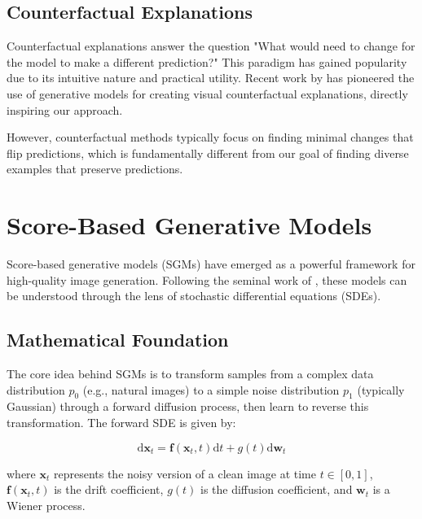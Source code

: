 \documentclass[licencjacka,en]{pracamgr}
\newcommand{\diff}{\mathrm{d}}
\begin{document}
\subsection{Counterfactual Explanations}

Counterfactual explanations answer the question "What would need to change for the model to make a different prediction?" This paradigm has gained popularity due to its intuitive nature and practical utility. Recent work by \cite{sobieski2024rethinkingvisualcounterfactualexplanations} has pioneered the use of generative models for creating visual counterfactual explanations, directly inspiring our approach.

However, counterfactual methods typically focus on finding minimal changes that flip predictions, which is fundamentally different from our goal of finding diverse examples that preserve predictions.

\section{Score-Based Generative Models}\label{sec:sgm_background}

Score-based generative models (SGMs) have emerged as a powerful framework for high-quality image generation. Following the seminal work of \cite{song2021scorebasedgenerativemodelingstochastic}, these models can be understood through the lens of stochastic differential equations (SDEs).

\subsection{Mathematical Foundation}

The core idea behind SGMs is to transform samples from a complex data distribution $p_0$ (e.g., natural images) to a simple noise distribution $p_1$ (typically Gaussian) through a forward diffusion process, then learn to reverse this transformation. The forward SDE is given by:

\begin{equation}
\diff \mathbf{x}_t = \mathbf{f}(\mathbf{x}_t, t) \diff t + g(t) \diff \mathbf{w}_t
\label{eq:forward_sde}
\end{equation}

where $\mathbf{x}_t$ represents the noisy version of a clean image at time $t \in [0, 1]$, $\mathbf{f}(\mathbf{x}_t, t)$ is the drift coefficient, $g(t)$ is the diffusion coefficient, and $\mathbf{w}_t$ is a Wiener process.
\end{document}
